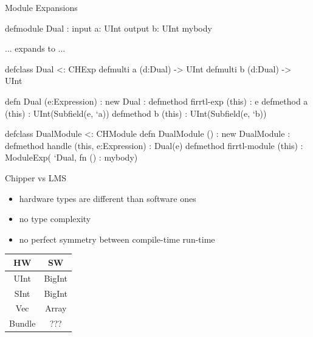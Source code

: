 \documentclass[xcolor=pdflatex,dvipsnames,table]{beamer}
\begin{document}
\begin{frame}[fragile]{Module Expansions}

\begin{stanza}
defmodule Dual :
   input a: UInt
   output b: UInt
   mybody
\end{stanza}

... expands to ...

{
\begin{stanza}
defclass Dual <: CHExp
defmulti a (d:Dual) -> UInt
defmulti b (d:Dual) -> UInt

defn Dual (e:Expression) :
   new Dual :
      defmethod firrtl-exp (this) : e
      defmethod a (this) :
         UInt(Subfield(e, `a))
      defmethod b (this) :
         UInt(Subfield(e, `b))

defclass DualModule <: CHModule
defn DualModule () :
   new DualModule :
      defmethod handle (this, e:Expression) :
         Dual(e)
      defmethod firrtl-module (this) :
         ModuleExp(
            `Dual,
            fn () : mybody)
\end{stanza}
}
\end{frame}

\begin{frame}[fragile]{Chipper vs LMS}
\begin{itemize}
\item hardware types are different than software ones
\item no type complexity
\item no perfect symmetry between compile-time run-time
\end{itemize}
\begin{tabular}{|c|c|}
\hline
{\bf HW} & {\bf SW} \\
\hline
\hline
UInt & BigInt \\
\hline
SInt & BigInt \\
\hline
Vec & Array \\
\hline
Bundle & ??? \\
\hline
\end{tabular}
\end{frame}
\end{document}
